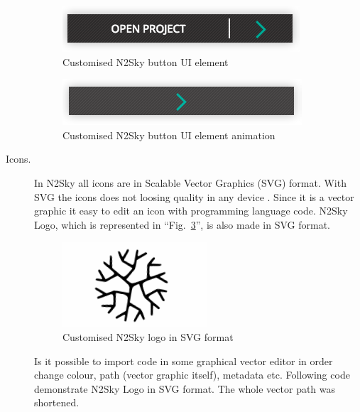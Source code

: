 \begin{description}
\begin{figure}[htbp]
\begin{center}
  \includegraphics[scale=0.55]{components/3/components/button_inactive.png}
  \caption{Customised N2Sky button UI element}
  \label{fig:button_inactive}
\end{center}
\end{figure}


\begin{figure}[htbp]
\begin{center}
  \includegraphics[scale=0.55]{components/3/components/button_active.png}
  \caption{Customised N2Sky button UI element animation}
  \label{fig:button_active}
\end{center}
\end{figure}

\item[Icons.] In N2Sky all icons are in Scalable Vector Graphics (SVG) format. With SVG the icons does not loosing quality in any device \cite{Cagle2005}. Since it is a vector graphic it easy to edit an icon with programming language code. N2Sky Logo, which is represented in ``Fig.~\ref{fig:logo}'',  is also made in SVG format. 

\begin{figure}[htbp]
\begin{center}
  \includegraphics[scale=0.55]{components/3/components/logo.png}
  \caption{Customised N2Sky logo in SVG format}
  \label{fig:logo}
\end{center}
\end{figure}

Is it possible to import code in some graphical vector editor in order change colour, path (vector graphic itself), metadata etc. Following code demonstrate N2Sky Logo in SVG format. The whole vector path was shortened.


\end{description}
